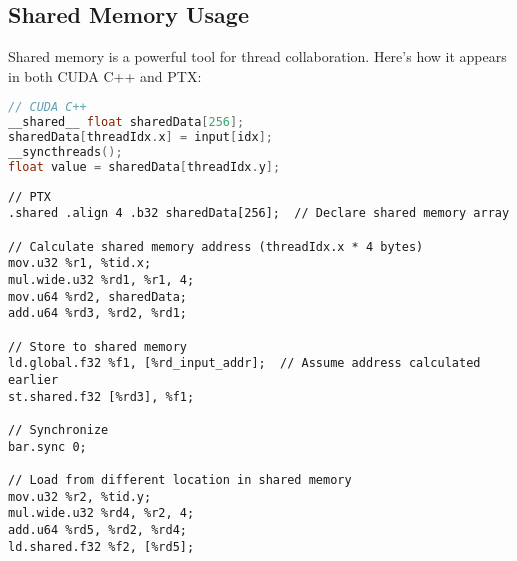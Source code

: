 \subsection{Shared Memory Usage}

Shared memory is a powerful tool for thread collaboration. Here's how it appears in both CUDA C++ and PTX:

\begin{lstlisting}[language=C++]
// CUDA C++
__shared__ float sharedData[256];
sharedData[threadIdx.x] = input[idx];
__syncthreads();
float value = sharedData[threadIdx.y];
\end{lstlisting}

\begin{lstlisting}[style=ptx]
// PTX
.shared .align 4 .b32 sharedData[256];  // Declare shared memory array

// Calculate shared memory address (threadIdx.x * 4 bytes)
mov.u32 %r1, %tid.x;
mul.wide.u32 %rd1, %r1, 4;
mov.u64 %rd2, sharedData;
add.u64 %rd3, %rd2, %rd1;

// Store to shared memory
ld.global.f32 %f1, [%rd_input_addr];  // Assume address calculated earlier
st.shared.f32 [%rd3], %f1;

// Synchronize
bar.sync 0;

// Load from different location in shared memory
mov.u32 %r2, %tid.y;
mul.wide.u32 %rd4, %r2, 4;
add.u64 %rd5, %rd2, %rd4;
ld.shared.f32 %f2, [%rd5];
\end{lstlisting}

